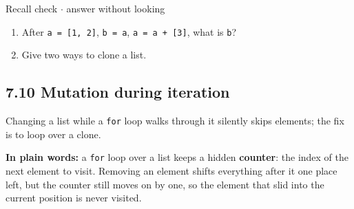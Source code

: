 \documentclass[11pt]{article}
\begin{document}
\begin{keepsection}
\begin{recallbox}{Recall check \ensuremath{\cdot} answer without looking}
\begin{enumerate}
\item After \texttt{a = [1, 2]}, \texttt{b = a}, \texttt{a = a + [3]}, what is \texttt{b}?
\item Give two ways to clone a list.
\end{enumerate}

\end{recallbox}
\end{keepsection}

\begin{keepsection}
\section{7.10 Mutation during iteration}

Changing a list while a \texttt{for} loop walks through it silently skips elements; the fix is to loop over a clone.

\begin{plainbox}\textbf{In plain words:} a \texttt{for} loop over a list keeps a hidden \textbf{counter}: the index of the next element to visit. Removing an element shifts everything after it one place left, but the counter still moves on by one, so the element that slid into the current position is never visited.\end{plainbox}


\end{keepsection}
\end{document}
